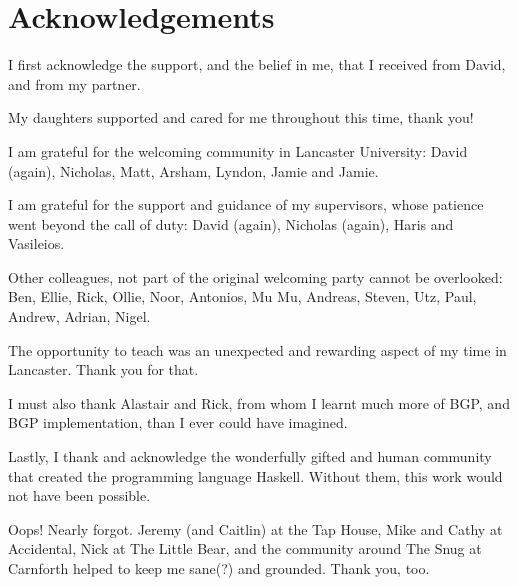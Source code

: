 {\centering \section*{Acknowledgements}}

I first acknowledge the support, and the belief in me, that I received from David, and from my partner.

\smallskip

My daughters supported and cared for me throughout this time, thank you!

\smallskip

I am grateful for the welcoming community in Lancaster University:
David (again), Nicholas, Matt, Arsham, Lyndon, Jamie and Jamie.

\smallskip

I am grateful for the support and guidance of my supervisors, whose patience went beyond the call of duty:
David (again), Nicholas (again), Haris and Vasileios.

\smallskip

Other colleagues, not part of the original welcoming party cannot be overlooked: Ben, Ellie, Rick, Ollie, Noor, Antonios, Mu Mu, Andreas, Steven, Utz, Paul, Andrew, Adrian, Nigel.

\smallskip

The opportunity to teach was an unexpected and rewarding aspect of my time in Lancaster.  Thank you for that.

\smallskip

I must also thank Alastair and Rick, from whom I learnt much more of BGP, and BGP implementation, than I ever could have imagined.

\smallskip

Lastly, I thank and acknowledge the wonderfully gifted and human community that created the programming language Haskell.  Without them, this work would not have been possible.

\smallskip

Oops!  Nearly forgot.  Jeremy (and Caitlin) at the Tap House, Mike and Cathy at Accidental, Nick at The Little Bear, and the community around The Snug at Carnforth helped to keep me sane(?) and grounded.  Thank you, too.